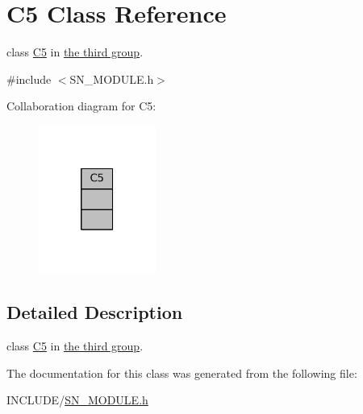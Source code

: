 \hypertarget{classC5}{}\section{C5 Class Reference}
\label{classC5}


class \hyperlink{classC5}{C5} in \hyperlink{group__group3}{the third group}.  




{\ttfamily \#include $<$S\+N\+\_\+\+M\+O\+D\+U\+L\+E.\+h$>$}



Collaboration diagram for C5\+:
\nopagebreak
\begin{figure}[H]
\begin{center}
\leavevmode
\includegraphics[width=109pt]{classC5__coll__graph}
\end{center}
\end{figure}


\subsection{Detailed Description}
class \hyperlink{classC5}{C5} in \hyperlink{group__group3}{the third group}. 

The documentation for this class was generated from the following file\+:\begin{DoxyCompactItemize}
\item 
I\+N\+C\+L\+U\+D\+E/\hyperlink{SN__MODULE_8h}{S\+N\+\_\+\+M\+O\+D\+U\+L\+E.\+h}\end{DoxyCompactItemize}
